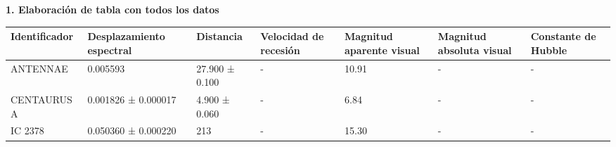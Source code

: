 \textbf{1. Elaboración de tabla con todos los datos}

\vspace{20px}

\begin{table}[H]
    \footnotesize
    \begin{tabular}{|p{73px}|p{88px}|p{63px}|p{1.75cm}|p{1.75cm}|p{1.75cm}|p{1.75cm}|}
        \hline
        \textbf{Identificador} & \textbf{Desplazamiento espectral} & \textbf{Distancia} & \textbf{Velocidad de recesión}
        & \textbf{Magnitud aparente visual} & \textbf{Magnitud absoluta visual} & \textbf{Constante de Hubble} \\
        \hline
        ANTENNAE & 0.005593 & 27.900 ± 0.100 & - & 10.91 & - & - \\
        CENTAURUS A & 0.001826 ± 0.000017 & 4.900 ± 0.060 & - & 6.84 & - & - \\
        IC 2378 & 0.050360 ± 0.000220 & 213 & - & 15.30 & - & - \\
        \hline
    \end{tabular}
\end{table}

